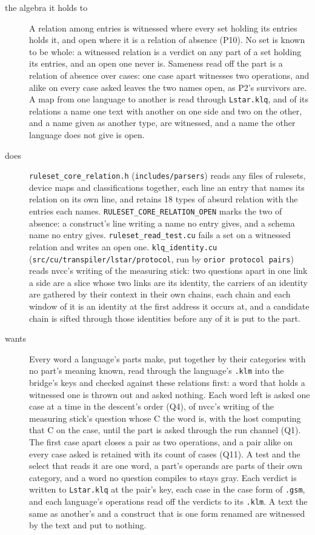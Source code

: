 \begin{description}
\item[{the algebra it holds to}] A relation among entries is witnessed where every set holding its entries holds it, and open where it is a relation of absence (P10). No set is known to be whole: a witnessed relation is a verdict on any part of a set holding its entries, and an open one never is. Sameness read off the part is a relation of absence over cases: one case apart witnesses two operations, and alike on every case asked leaves the two names open, as P2's survivors are. A map from one language to another is read through \texttt{Lstar.\allowbreak{}klq}, and of its relations a name one text with another on one side and two on the other, and a name given as another type, are witnessed, and a name the other language does not give is open.
\item[{does}] \texttt{ruleset\_\allowbreak{}core\_\allowbreak{}relation.\allowbreak{}h} (\texttt{includes/\allowbreak{}parsers}) reads any files of rulesets, device maps and classifications together, each line an entry that names its relation on its own line, and retains 18 types of absurd relation with the entries each names. \texttt{RULESET\_\allowbreak{}CORE\_\allowbreak{}RELATION\_\allowbreak{}OPEN} marks the two of absence: a construct's line writing a name no entry gives, and a schema name no entry gives. \texttt{ruleset\_\allowbreak{}read\_\allowbreak{}test.\allowbreak{}cu} fails a set on a witnessed relation and writes an open one. \texttt{klq\_\allowbreak{}identity.\allowbreak{}cu} (\texttt{src/\allowbreak{}cu/\allowbreak{}transpiler/\allowbreak{}lstar/\allowbreak{}protocol}, run by \texttt{orior protocol pairs}) reads nvcc's writing of the measuring stick: two questions apart in one link a side are a slice whose two links are its identity, the carriers of an identity are gathered by their context in their own chains, each chain and each window of it is an identity at the first address it occurs at, and a candidate chain is sifted through those identities before any of it is put to the part.
\item[{wants}] Every word a language's parts make, put together by their categories with no part's meaning known, read through the language's \texttt{.\allowbreak{}klm} into the bridge's keys and checked against these relations first: a word that holds a witnessed one is thrown out and asked nothing. Each word left is asked one case at a time in the descent's order (Q4), of nvcc's writing of the measuring stick's question whose C the word is, with the host computing that C on the case, until the part is asked through the run channel (Q1). The first case apart closes a pair as two operations, and a pair alike on every case asked is retained with its count of cases (Q11). A test and the select that reads it are one word, a part's operands are parts of their own category, and a word no question compiles to stays gray. Each verdict is written to \texttt{Lstar.\allowbreak{}klq} at the pair's key, each case in the case form of \texttt{.\allowbreak{}gsm}, and each language's operations read off the verdicts to its \texttt{.\allowbreak{}klm}. A text the same as another's and a construct that is one form renamed are witnessed by the text and put to nothing.

\end{description}
